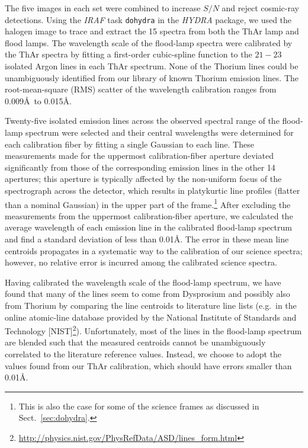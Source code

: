 \documentclass[traditabstract]{aa} %
\begin{document}
The five images in each set were combined to increase $S/N$ and reject
cosmic-ray detections.  Using the {\it IRAF} task {\tt dohydra} in the {\it
HYDRA} package, we used the halogen image to trace and extract the 15 spectra
from both the ThAr lamp and flood lamps.  The wavelength scale of the flood-lamp
spectra were calibrated by the ThAr spectra by fitting a first-order
cubic-spline function to the $21-23$ isolated Argon lines in each ThAr spectrum.
None of the Thorium lines could be unambiguously identified from our library of
known Thorium emission lines.  The root-mean-square (RMS) scatter of the
wavelength calibration ranges from 0.009\AA\ to 0.015\AA.

Twenty-five isolated emission lines across the observed spectral range of the
flood-lamp spectrum were selected and their central wavelengths were determined
for each calibration fiber by fitting a single Gaussian to each line.  These
measurements made for the uppermost calibration-fiber aperture deviated
significantly from those of the corresponding emission lines in the other 14
apertures; this aperture is typically affected by the non-uniform focus of the
spectrograph across the detector, which results in platykurtic line profiles
(flatter than a nominal Gaussian) in the upper part of the frame.\footnote{
%
This is also the case for some of the science frames as discussed in 
Sect.~\ref{sec:dohydra}.
%
}  After excluding the measurements from the uppermost calibration-fiber
aperture, we calculated the average wavelength of each emission line in the
calibrated flood-lamp spectrum and find a standard deviation of less than
0.01\AA.  The error in these mean line centroids propagates in a systematic way
to the calibration of our science spectra; however, no relative error is
incurred among the calibrated science spectra.

Having calibrated the wavelength scale of the flood-lamp spectrum, we have found
that many of the lines seem to come from Dysprosium and possibly also from
Thorium by comparing the line centroids to literature line lists (e.g.\ in the
online atomic-line database provided by the National Institute of Standards and
Technology [NIST]\footnote{\tiny
%
\url{http://physics.nist.gov/PhysRefData/ASD/lines\_form.html}
%
}).
%
Unfortunately, most of the lines in the flood-lamp spectrum are blended such
that the measured centroids cannot be unambiguously correlated to the literature
reference values.  Instead, we choose to adopt the values found from our ThAr
calibration, which should have errors smaller than 0.01\AA.
\end{document}
